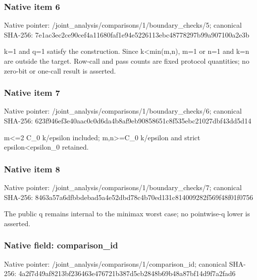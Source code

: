 \documentclass[10pt,a4paper]{article}
\begin{document}
\subsubsection{Native item 6}
Native pointer: /joint\_\allowbreak{}analysis/comparisons/1/boundary\_\allowbreak{}checks/5; canonical SHA-256: 7e1ac3ec2ce90cef4a11680faf1e94e5226113ebc48778297b99a907100a2e3b

\begingroup\raggedright\sloppy k=\allowbreak{}1 and q=\allowbreak{}1 satisfy the construction. Since k<min(m,\allowbreak{}n),\allowbreak{} m=\allowbreak{}1 or n=\allowbreak{}1 and k=\allowbreak{}n are outside the target. Row-call and pass counts are fixed protocol quantities;\allowbreak{} no zero-bit or one-call result is asserted.\par\endgroup

\subsubsection{Native item 7}
Native pointer: /joint\_\allowbreak{}analysis/comparisons/1/boundary\_\allowbreak{}checks/6; canonical SHA-256: 623f946ef3e40aac0c0d6da4b8af9eb90858651c8f535ebc21027dbf43dd5d14

\begingroup\raggedright\sloppy m<=\allowbreak{}2 C\_\allowbreak{}0 k/\allowbreak{}epsilon included;\allowbreak{} m,\allowbreak{}n>=\allowbreak{}C\_\allowbreak{}0 k/\allowbreak{}epsilon and strict epsilon<epsilon\_\allowbreak{}0 retained.\par\endgroup

\subsubsection{Native item 8}
Native pointer: /joint\_\allowbreak{}analysis/comparisons/1/boundary\_\allowbreak{}checks/7; canonical SHA-256: 8463a57a6dfbbdebad5a4e52dbd78c4b70ed131c814009282f569f48f01f0756

\begingroup\raggedright\sloppy The public q remains internal to the minimax worst case;\allowbreak{} no pointwise-q lower is asserted.\par\endgroup

\subsubsection{Native field: comparison\_\allowbreak{}id}
Native pointer: /joint\_\allowbreak{}analysis/comparisons/1/comparison\_\allowbreak{}id; canonical SHA-256: 4a2f7d49af8213bf236463e476721b387d5cb2848b69b48a87bf14d9f7a2fad6
\end{document}
